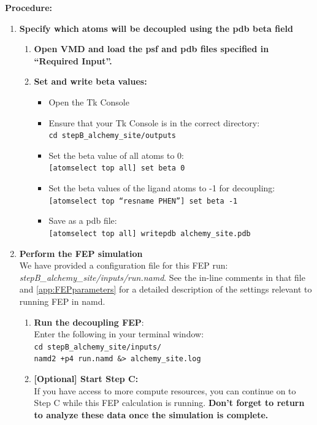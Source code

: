 \documentclass[9pt,tutorial]{Styling/livecoms}
\newcommand{\filepath}[1]{\textit{#1}}
\newcommand{\textInput}[1]{
  \texttt{#1}
}
\begin{document}
\textbf{Procedure:}
\begin{enumerate}
    \item \textbf{Specify which atoms will be decoupled using the pdb beta field}\label{step:makeFEPpdbSite} 
        \begin{enumerate}[label=\alph*., ref=\theenumi.\alph*]
            \item \textbf{Open VMD and load the psf and pdb files specified in ``Required Input''.}
            \item \textbf{Set and write beta values:}
            \begin{itemize}
                \item Open the Tk Console
                \item Ensure that your Tk Console is in the correct directory:\\
                \textInput{cd stepB\_alchemy\_site/outputs}
                \item Set the beta value of all atoms to 0:\\
                \textInput{[atomselect top all] set beta 0}
                \item Set the beta values of the ligand atoms to -1 for decoupling:\\
                \textInput{[atomselect top ``resname PHEN''] set beta -1}
                \item Save as a pdb file:\\
                \textInput{[atomselect top all] writepdb alchemy\_site.pdb}
            \end{itemize}
        \end{enumerate}

    \item \textbf{Perform the FEP simulation}\\
    We have provided a configuration file for this FEP run: \filepath{stepB\_alchemy\_site/inputs/run.namd}. See the in-line comments in that file and \ref{app:FEPparameters} for a detailed description of the settings relevant to running FEP in namd.
    \begin{enumerate}[label=\alph*., ref=\theenumi.\alph*]     
         \item \textbf{Run the decoupling FEP}:\\
         Enter the following in your terminal window:\\
            \textInput{cd stepB\_alchemy\_site/inputs/}\\
            \textInput{namd2 +p4 run.namd \&> alchemy\_site.log}
        \item \textbf{[Optional] Start Step C:}\\
        If you have access to more compute resources, you can continue on to Step C while this FEP calculation is running. \textbf{Don't forget to return to analyze these data once the simulation is complete.} 
    \end{enumerate}
    

\end{enumerate}
\end{document}
